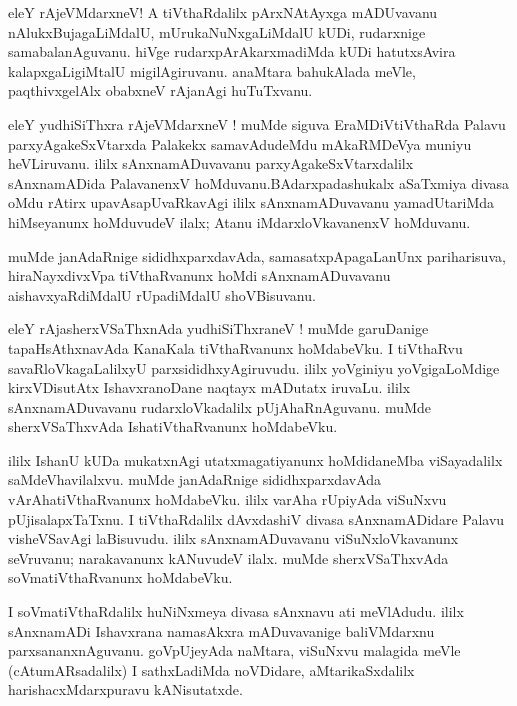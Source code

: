 \documentclass{article}
\begin{document}
\begin{mn}
eleY rAjeVMdarxneV! A tiVthaRdalilx pArxNAtAyxga mADUvavanu nAlukxBujagaLiMdalU, 
mUrukaNuNxgaLiMdalU kUDi, rudarxnige samabalanAguvanu. hiVge rudarxpArAkarxmadiMda kUDi 
hatutxsAvira kalapxgaLigiMtalU migilAgiruvanu. anaMtara bahukAlada meVle, paqthivxgelAlx obabxneV 
rAjanAgi huTuTxvanu.
\end{mn}

\begin{mn}
eleY yudhiSiThxra rAjeVMdarxneV ! muMde siguva EraMDiVtiVthaRda Palavu parxyAgakeSxVtarxda 
Palakekx samavAdudeMdu mAkaRMDeVya muniyu heVLiruvanu. ililx sAnxnamADuvavanu 
parxyAgakeSxVtarxdalilx sAnxnamADida PalavanenxV hoMduvanu.BAdarxpadashukalx aSaTxmiya divasa 
oMdu rAtirx upavAsapUvaRkavAgi ililx sAnxnamADuvavanu yamadUtariMda hiMseyanunx hoMduvudeV ilalx; 
Atanu iMdarxloVkavanenxV hoMduvanu.
\end{mn}

\begin{mn}
muMde janAdaRnige sididhxparxdavAda, samasatxpApagaLanUnx pariharisuva, hiraNayxdivxVpa 
tiVthaRvanunx hoMdi sAnxnamADuvavanu aishavxyaRdiMdalU rUpadiMdalU shoVBisuvanu.
\end{mn}

\begin{mn}
eleY rAjasherxVSaThxnAda yudhiSiThxraneV ! muMde garuDanige tapaHsAthxnavAda KanaKala 
tiVthaRvanunx hoMdabeVku. I tiVthaRvu savaRloVkagaLalilxyU parxsididhxyAgiruvudu. ililx 
yoVginiyu yoVgigaLoMdige kirxVDisutAtx IshavxranoDane naqtayx mADutatx iruvaLu. ililx 
sAnxnamADuvavanu rudarxloVkadalilx pUjAhaRnAguvanu. muMde sherxVSaThxvAda IshatiVthaRvanunx 
hoMdabeVku.
\end{mn}

\begin{mn}
ililx IshanU kUDa mukatxnAgi utatxmagatiyanunx hoMdidaneMba viSayadalilx saMdeVhavilalxvu. muMde 
janAdaRnige sididhxparxdavAda vArAhatiVthaRvanunx hoMdabeVku. ililx varAha rUpiyAda viSuNxvu 
pUjisalapxTaTxnu. I tiVthaRdalilx dAvxdashiV divasa sAnxnamADidare Palavu visheVSavAgi 
laBisuvudu. ililx sAnxnamADuvavanu viSuNxloVkavanunx seVruvanu; narakavanunx kANuvudeV ilalx. 
muMde sherxVSaThxvAda soVmatiVthaRvanunx hoMdabeVku.
\end{mn}

\begin{mn}
I soVmatiVthaRdalilx huNiNxmeya divasa sAnxnavu ati meVlAdudu. ililx sAnxnamADi Ishavxrana 
namasAkxra mADuvavanige baliVMdarxnu parxsananxnAguvanu. goVpUjeyAda naMtara, viSuNxvu malagida 
meVle (cAtumARsadalilx) I sathxLadiMda noVDidare, aMtarikaSxdalilx harishacxMdarxpuravu 
kANisutatxde.
\end{mn}
\end{document}
